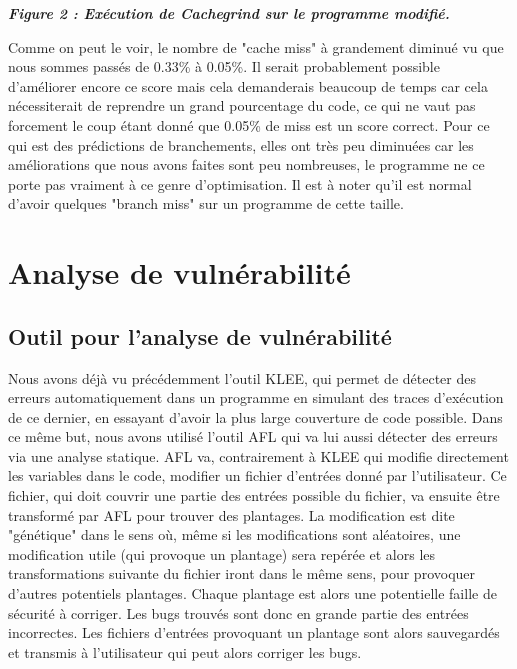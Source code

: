 \documentclass{report}
\begin{document}
\begin{center}
\textbf{\textit{Figure 2 : Exécution de Cachegrind sur le programme modifié.}}
\end{center}

Comme on peut le voir, le nombre de "cache miss" à grandement diminué vu que nous sommes passés de 0.33\% à 0.05\%. 
\newline
Il serait probablement possible d'améliorer encore ce score mais cela demanderais beaucoup de temps car cela nécessiterait de reprendre un grand pourcentage du code, ce qui ne vaut pas forcement le coup étant donné que 0.05\% de miss est un score correct.
\newline
Pour ce qui est des prédictions de branchements, elles ont très peu diminuées car les améliorations que nous avons faites sont peu nombreuses, le programme ne ce porte pas vraiment à ce genre d'optimisation.
\newline
Il est à noter qu'il est normal d'avoir quelques "branch miss" sur un programme de cette taille.

\chapter{Analyse de vulnérabilité }
\section{Outil pour l'analyse de vulnérabilité}
Nous avons déjà vu précédemment l'outil KLEE, qui permet de détecter des erreurs automatiquement dans un programme en simulant des traces d’exécution de ce dernier, en essayant d'avoir la plus large couverture de code possible. 
\newline 
Dans ce même but, nous avons utilisé l'outil AFL qui va lui aussi détecter des erreurs via une analyse statique. AFL va, contrairement à KLEE qui modifie directement les variables dans le code, modifier un fichier d'entrées donné par l'utilisateur.
\newline
Ce fichier, qui doit couvrir une partie des entrées possible du fichier, va ensuite être transformé par AFL pour trouver des plantages.
\newline
La modification est dite "génétique" dans le sens où, même si les modifications sont aléatoires, une modification utile (qui provoque un plantage) sera repérée et alors les transformations suivante du fichier iront dans le même sens, pour provoquer d'autres potentiels plantages.
\newline
Chaque plantage est alors une potentielle faille de sécurité à corriger.
Les bugs trouvés sont donc en grande partie des entrées incorrectes. 
\newline
Les fichiers d'entrées provoquant un plantage sont alors sauvegardés et transmis à l'utilisateur qui peut alors corriger les bugs.
\end{document}
